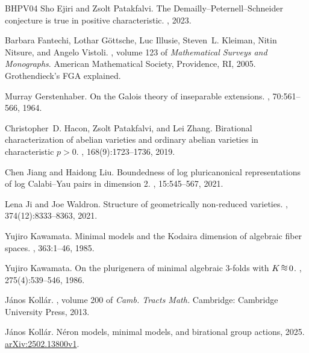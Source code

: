 \documentclass[10pt,abstract=true]{scrartcl}
\numberwithin{equation}{section}
\theoremstyle{definition}
\theoremstyle{remark}
\begin{document}
\begin{thebibliography}{BHPV04}
Sho Ejiri and Zsolt Patakfalvi.
\newblock The {Demailly--Peternell--Schneider} conjecture is true in positive characteristic.
, 2023.

Barbara Fantechi, Lothar G\"{o}ttsche, Luc Illusie, Steven~L. Kleiman, Nitin Nitsure, and Angelo Vistoli.
, volume 123 of {\em Mathematical Surveys and Monographs}.
\newblock American Mathematical Society, Providence, RI, 2005.
\newblock Grothendieck's FGA explained.

Murray Gerstenhaber.
\newblock On the {Galois} theory of inseparable extensions.
, 70:561--566, 1964.

Christopher~D. Hacon, Zsolt Patakfalvi, and Lei Zhang.
\newblock Birational characterization of abelian varieties and ordinary abelian varieties in characteristic {{\(p>0\)}}.
, 168(9):1723--1736, 2019.

Chen Jiang and Haidong Liu.
\newblock Boundedness of log pluricanonical representations of log {Calabi--Yau} pairs in dimension 2.
, 15:545--567, 2021.

Lena Ji and Joe Waldron.
\newblock Structure of geometrically non-reduced varieties.
, 374(12):8333--8363, 2021.

Yujiro Kawamata.
\newblock Minimal models and the {Kodaira} dimension of algebraic fiber spaces.
, 363:1--46, 1985.

Yujiro Kawamata.
\newblock On the plurigenera of minimal algebraic $3$-folds with {$K\mathop {\protect \rlap {\raise 3.25pt\hbox {$\sim $}}\protect \rlap {$\approx $}\protect \phantom {\approx }}0$}.
, 275(4):539--546, 1986.

J{\'a}nos Koll{\'a}r.
, volume 200 of {\em Camb. Tracts Math.}
\newblock Cambridge: Cambridge University Press, 2013.

J{\'a}nos Koll{\'a}r.
\newblock N\'eron models, minimal models, and birational group actions, 2025.
\newblock \href{https://arxiv.org/abs/2502.13800v1}{arXiv:2502.13800v1}.


\end{thebibliography}
\end{document}
